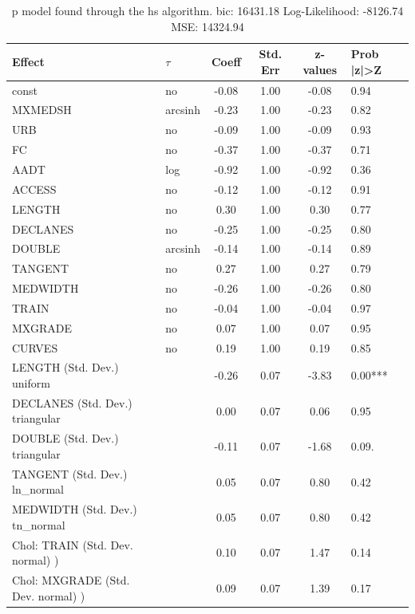 \begin{table}
	\caption{p model found through the hs algorithm. bic: 16431.18 Log-Likelihood: -8126.74 MSE: 14324.94}
	\begin{center}
		\begin{tabular}{|l|l|c|c|c|l|}
			\hline
			Effect & $\tau$ & Coeff & Std. Err & z-values & Prob |z|>Z \\
			\hline
			const & no & -0.08 & 1.00 & -0.08 & 0.94 \\
			\hline
			MXMEDSH & arcsinh & -0.23 & 1.00 & -0.23 & 0.82 \\
			\hline
			URB & no & -0.09 & 1.00 & -0.09 & 0.93 \\
			\hline
			FC & no & -0.37 & 1.00 & -0.37 & 0.71 \\
			\hline
			AADT & log & -0.92 & 1.00 & -0.92 & 0.36 \\
			\hline
			ACCESS & no & -0.12 & 1.00 & -0.12 & 0.91 \\
			\hline
			LENGTH & no & 0.30 & 1.00 & 0.30 & 0.77 \\
			\hline
			DECLANES & no & -0.25 & 1.00 & -0.25 & 0.80 \\
			\hline
			DOUBLE & arcsinh & -0.14 & 1.00 & -0.14 & 0.89 \\
			\hline
			TANGENT & no & 0.27 & 1.00 & 0.27 & 0.79 \\
			\hline
			MEDWIDTH & no & -0.26 & 1.00 & -0.26 & 0.80 \\
			\hline
			TRAIN & no & -0.04 & 1.00 & -0.04 & 0.97 \\
			\hline
			MXGRADE & no & 0.07 & 1.00 & 0.07 & 0.95 \\
			\hline
			CURVES & no & 0.19 & 1.00 & 0.19 & 0.85 \\
			\hline
			LENGTH (Std. Dev.) uniform &  & -0.26 & 0.07 & -3.83 & 0.00*** \\
			\hline
			DECLANES (Std. Dev.) triangular &  & 0.00 & 0.07 & 0.06 & 0.95 \\
			\hline
			DOUBLE (Std. Dev.) triangular &  & -0.11 & 0.07 & -1.68 & 0.09. \\
			\hline
			TANGENT (Std. Dev.) ln_normal &  & 0.05 & 0.07 & 0.80 & 0.42 \\
			\hline
			MEDWIDTH (Std. Dev.) tn_normal &  & 0.05 & 0.07 & 0.80 & 0.42 \\
			\hline
			 Chol: TRAIN (Std. Dev. normal) ) &  & 0.10 & 0.07 & 1.47 & 0.14 \\
			\hline
			 Chol: MXGRADE (Std. Dev. normal) ) &  & 0.09 & 0.07 & 1.39 & 0.17 \\

\end{tabular}
\end{center}
\end{table}
